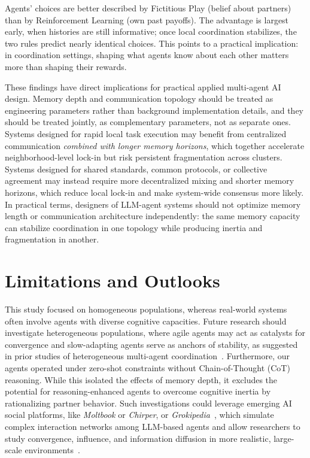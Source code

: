 \documentclass{article}
\begin{document}
Agents' choices are better described by Fictitious Play (belief about partners) than by Reinforcement Learning (own past payoffs). The advantage is largest early, when histories are still informative; once local coordination stabilizes, the two rules predict nearly identical choices. This points to a practical implication: in coordination settings, shaping what agents know about each other matters more than shaping their rewards.

These findings have direct implications for practical applied multi-agent AI design. Memory depth and communication topology should be treated as engineering parameters rather than background implementation details, and they should be treated jointly, as complementary parameters, not as separate ones. Systems designed for rapid local task execution may benefit from centralized communication \emph{combined with longer memory horizons}, which together accelerate neighborhood-level lock-in but risk persistent fragmentation across clusters. Systems designed for shared standards, common protocols, or collective agreement may instead require more decentralized mixing and shorter memory horizons, which reduce local lock-in and make system-wide consensus more likely. In practical terms, designers of LLM-agent systems should not optimize memory length or communication architecture independently: the same memory capacity can stabilize coordination in one topology while producing inertia and fragmentation in another.

\section*{Limitations and Outlooks}

This study focused on homogeneous populations, whereas real-world systems often involve agents with diverse cognitive capacities. Future research should investigate heterogeneous populations, where agile agents may act as catalysts for convergence and slow-adapting agents serve as anchors of stability, as suggested in prior studies of heterogeneous multi-agent coordination~\cite{centola2007complex, kearns2006experimental}. Furthermore, our agents operated under zero-shot constraints without Chain-of-Thought (CoT) reasoning. While this isolated the effects of memory depth, it excludes the potential for reasoning-enhanced agents to overcome cognitive inertia by rationalizing partner behavior. Such investigations could leverage emerging AI social platforms, like \textit{Moltbook} or \textit{Chirper}, or \textit{Grokipedia}~\cite{yee2026molt,fadaei2026gender,mehdizadeh2025epistemic}, which simulate complex interaction networks among LLM-based agents and allow researchers to study convergence, influence, and information diffusion in more realistic, large-scale environments~\cite{lin2026exploring,luo2023analyzing}.
\end{document}
